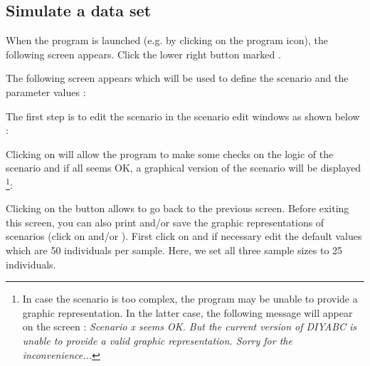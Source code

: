 \subsection{Simulate a data set}

When the program is launched (e.g. by clicking on the program icon), the following screen appears. Click the lower right button marked .


The following screen appears which will be used to define the scenario and the parameter values :


\clearpage
The first step is to edit the scenario in the scenario edit windows as shown below :



Clicking on   will allow the program to make some checks on the logic of the scenario and if all seems OK, a graphical version of the scenario will be displayed \footnote{In case the scenario is too complex, the program may be unable to provide a graphic representation. In the latter case, the following message will appear on the screen : \emph{Scenario x seems OK. But the current version of DIYABC is unable to provide a valid graphic representation. Sorry for the inconvenience...}}:


Clicking on the  button allows to go back to the previous screen. Before exiting this screen, you can also print and/or save the graphic representations of scenarios (click on  and/or ).
\clearpage
First click on  and if necessary edit the default values which are 50 individuals per sample. Here, we set all three sample sizes to 25 individuals.

